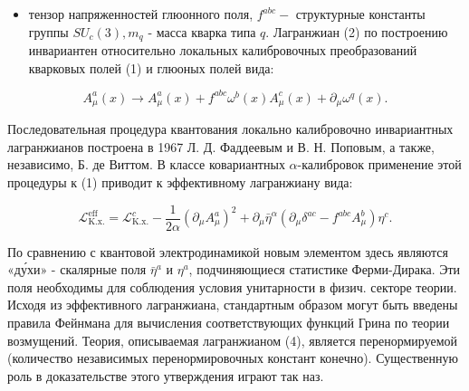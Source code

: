 \documentclass[10pt]{article}
\begin{document}
\begin{itemize}

  \item тензор напряженностей глюонного поля, $f^{a b c}-$ структурные константы группы $S U_{c}(3), m_{q}$ - масса кварка типа $q$. Лагранжиан (2) по построению инвариантен относительно локальных калибровочных преобразований кварковых полей (1) и глюоных полей вида:

\end{itemize}



\[

A_{\mu}^{a}(x) \rightarrow A_{\mu}^{a}(x)+f^{a b c} \omega^{b}(x) A_{\mu}^{c}(x)+\partial_{\mu} \omega^{q}(x) .

\]



Последовательная процедура квантования локально калибровочно инвариантных лагранжианов построена в 1967 Л. Д. Фаддеевым и В. Н. Поповым, а также, независимо, Б. де Виттом. В классе ковариантных $\alpha$-калибровок применение этой процедуры к (1) приводит к эффективному лагранжиану вида:



\[

\mathscr{L}_{\mathrm{K} . \mathrm{x} .}^{\mathrm{eff}}=\mathscr{L}_{\mathrm{K} . \mathrm{x} .}^{c}-\frac{1}{2 \alpha}\left(\partial_{\mu} A_{\mu}^{a}\right)^{2}+\partial_{\mu} \bar{\eta}^{\alpha}\left(\partial_{\mu} \delta^{a c}-f^{a b c} A_{\mu}^{b}\right) \eta^{c} .

\]



По сравнению с квантовой электродинамикой новым элементом здесь являются «ду́хи» - скалярные поля $\bar{\eta}^{a}$ и $\eta^{a}$, подчиняющиеся статистике Ферми-Дирака. Эти поля необходимы для соблюдения условия унитарности в физич. секторе теории. Исходя из эффективного лагранжиана, стандартным образом могут быть введены правила Фейнмана для вычисления соответствующих функций Грина по теории возмущений. Теория, описываемая лагранжианом (4), является перенормируемой (количество независимых перенормировочных констант конечно). Существенную роль в доказательстве этого утверждения играют так наз.
\end{document}
